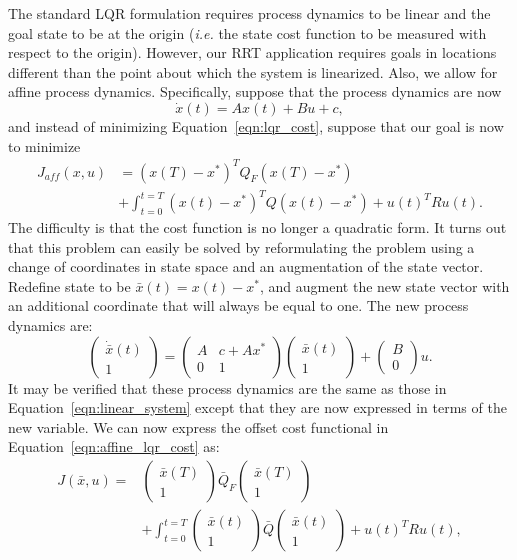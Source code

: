 \documentclass[letterpaper, 10pt, english, conference]{IEEEtran}
\begin{document}
The standard LQR formulation requires process dynamics to be linear
and the goal state to be at the origin ({\em i.e.} the state cost
function to be measured with respect to the origin). However, our RRT
application requires goals in locations different than the point about
which the system is linearized. Also, we allow for affine process
dynamics. Specifically, suppose that the process dynamics are now
\begin{equation}
\dot{x}(t) = A x(t) + B u + c,
\label{eqn:affine_dynamics}
\end{equation}
and instead of minimizing Equation~\ref{eqn:lqr_cost}, suppose that
our goal is now to minimize
\begin{align} \nonumber
J_{aff}(x,u) & = (x(T)-x^*)^T Q_F (x(T)-x^*) \\
& + \int_{t=0}^{t=T}
(x(t)-x^*)^T Q (x(t)-x^*) + u(t)^T R u(t).
\label{eqn:affine_lqr_cost}
\end{align}
The difficulty is that the cost function is no longer a quadratic
form. It turns out that this problem can easily be solved by
reformulating the problem using a change of coordinates in state space
and an augmentation of the state vector. Redefine state to be
$\bar{x}(t) = x(t) - x^*$, and augment the new state vector with an
additional coordinate that will always be equal to one. The new
process dynamics are:
\[
\left(
\begin{array}{c}
\dot{\bar{x}}(t) \\
1
\end{array}
\right)
=
\left(
\begin{array}{cc}
A & c + Ax^* \\
0 & 1
\end{array}
\right)
\left(
\begin{array}{c}
\bar{x}(t) \\
1
\end{array}
\right)
+ 
\left(
\begin{array}{c}
B \\
0
\end{array}
\right)
u.
\]
It may be verified that these process dynamics are the same as those
in Equation~\ref{eqn:linear_system} except that they are now expressed
in terms of the new variable. We can now express the offset cost
functional in Equation~\ref{eqn:affine_lqr_cost} as:
\begin{align} \nonumber
J(\bar{x},u) = & 
\left(
\begin{array}{c}
\bar{x}(T) \\
1
\end{array}
\right)
\bar{Q}_F
\left(
\begin{array}{c}
\bar{x}(T) \\
1
\end{array}
\right) \\
& + \int_{t=0}^{t=T}
\left(
\begin{array}{c}
\bar{x}(t) \\
1
\end{array}
\right)
\bar{Q}
\left(
\begin{array}{c}
\bar{x}(t) \\
1
\end{array}
\right)
+ u(t)^T R u(t),
\label{eqn:affine_lqr_cost}
\end{align}
\end{document}
